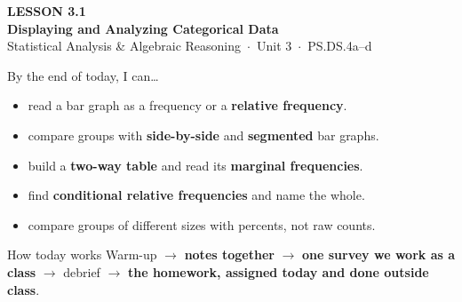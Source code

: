 \documentclass[aspectratio=169, 11pt]{beamer}
\begin{document}
{
\begin{frame}[plain]
  \vspace{2.8cm}\hspace{0.55cm}%
  \begin{minipage}{0.9\textwidth}
    {\color{goldacc}\bfseries\small LESSON 3.1}\\[0.5cm]
    {\color{white}\bfseries\LARGE Displaying and Analyzing Categorical Data}\\[1.2cm]
    {\color{frostmid}\small Statistical Analysis \& Algebraic Reasoning~$\cdot$~Unit 3~$\cdot$~PS.DS.4a--d}
  \end{minipage}
\end{frame}
}

\begin{frame}[t, plain]
  By the end of today, I can\ldots
  \begin{itemize}\setlength{\itemsep}{3pt}
    \item read a bar graph as a frequency or a \textbf{relative frequency}.
    \item compare groups with \textbf{side-by-side} and \textbf{segmented} bar graphs.
    \item build a \textbf{two-way table} and read its \textbf{marginal frequencies}.
    \item find \textbf{conditional relative frequencies} and name the whole.
    \item compare groups of different sizes with percents, not raw counts.
  \end{itemize}
  \begin{block}{How today works}
    Warm-up $\to$ \textbf{notes together} $\to$ \textbf{one survey we work as a class} $\to$
    debrief $\to$ \textbf{the homework, assigned today and done outside class}.
  \end{block}
\end{frame}
\end{document}
